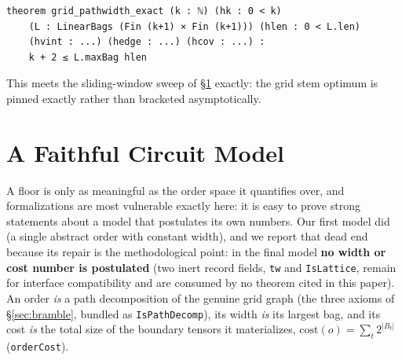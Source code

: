 \documentclass[sigplan,10pt,screen,review,anonymous]{acmart}
\begin{document}
\begin{lstlisting}
theorem grid_pathwidth_exact (k : ℕ) (hk : 0 < k)
    (L : LinearBags (Fin (k+1) × Fin (k+1))) (hlen : 0 < L.len)
    (hvint : ...) (hedge : ...) (hcov : ...) :
    k + 2 ≤ L.maxBag hlen
\end{lstlisting}

\noindent This meets the sliding-window sweep of \S\ref{sec:model} exactly: the grid stem
optimum is pinned exactly rather than bracketed asymptotically.

\section{A Faithful Circuit Model}\label{sec:model}

A floor is only as meaningful as the order space it quantifies over, and formalizations are
most vulnerable exactly here: it is easy to prove strong statements about a model that
postulates its own numbers. Our first model did (a single abstract order with constant
width), and we report that dead end because its repair is the methodological point: in
the final model \textbf{no width or cost number is postulated} (two inert record fields,
\lstinline|tw| and \lstinline|IsLattice|, remain for interface compatibility and are
consumed by no theorem cited in this paper). An order \emph{is} a path decomposition of
the genuine grid graph (the three axioms of \S\ref{sec:bramble}, bundled as
\lstinline|IsPathDecomp|), its width \emph{is} its largest bag, and its cost \emph{is} the
total size of the boundary tensors it materializes,
$\mathrm{cost}(o)=\sum_t 2^{|B_t|}$ (\lstinline|orderCost|).
\end{document}
